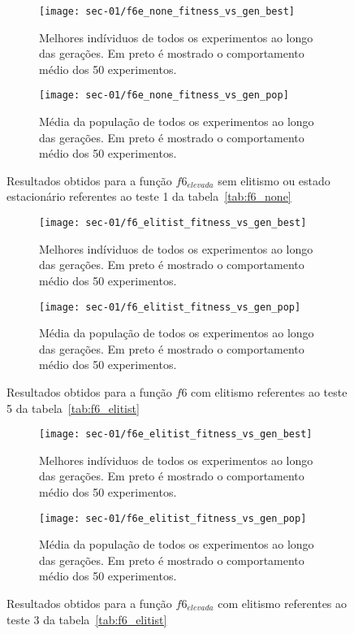 \begin{figure}[!htb]
	\begin{subfigure}{.45\textwidth}
		\centering
		\texttt{[image: sec-01/f6e\_none\_fitness\_vs\_gen\_best]}
		\caption{Melhores indíviduos de todos os experimentos ao longo das gerações.
		Em preto é mostrado o comportamento médio dos 50 experimentos. }
	\end{subfigure}
	\hfill
	\begin{subfigure}{.45\textwidth}
		\centering
		\texttt{[image: sec-01/f6e\_none\_fitness\_vs\_gen\_pop]}
		\caption{Média da população de todos os experimentos ao longo das gerações.
		Em preto é mostrado o comportamento médio dos 50 experimentos.}
	\end{subfigure}
	\caption{Resultados obtidos para a função $f6_{elevada}$ sem elitismo ou estado estacionário referentes ao teste 1 da tabela~\ref{tab:f6_none}}
\end{figure}

\begin{figure}[!htb]
	\begin{subfigure}{.45\textwidth}
		\centering
		\texttt{[image: sec-01/f6\_elitist\_fitness\_vs\_gen\_best]}
		\caption{Melhores indíviduos de todos os experimentos ao longo das gerações.
		Em preto é mostrado o comportamento médio dos 50 experimentos. }
	\end{subfigure}
	\hfill
	\begin{subfigure}{.45\textwidth}
		\centering
		\texttt{[image: sec-01/f6\_elitist\_fitness\_vs\_gen\_pop]}
		\caption{Média da população de todos os experimentos ao longo das gerações.
		Em preto é mostrado o comportamento médio dos 50 experimentos.}
	\end{subfigure}
	\caption{Resultados obtidos para a função $f6$ com elitismo referentes ao teste 5 da tabela~\ref{tab:f6_elitist}}
\end{figure}

\begin{figure}[!htb]
	\begin{subfigure}{.45\textwidth}
		\centering
		\texttt{[image: sec-01/f6e\_elitist\_fitness\_vs\_gen\_best]}
		\caption{Melhores indíviduos de todos os experimentos ao longo das gerações.
		Em preto é mostrado o comportamento médio dos 50 experimentos. }
	\end{subfigure}
	\hfill
	\begin{subfigure}{.45\textwidth}
		\centering
		\texttt{[image: sec-01/f6e\_elitist\_fitness\_vs\_gen\_pop]}
		\caption{Média da população de todos os experimentos ao longo das gerações.
		Em preto é mostrado o comportamento médio dos 50 experimentos.}
	\end{subfigure}
	\caption{Resultados obtidos para a função $f6_{elevada}$ com elitismo referentes ao teste 3 da tabela~\ref{tab:f6_elitist}}
\end{figure}

